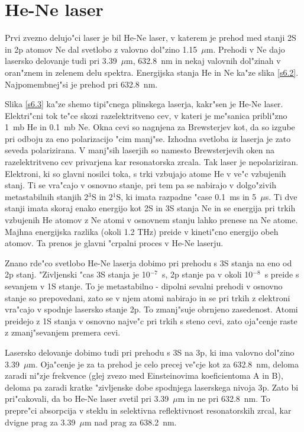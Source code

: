 \section{He-Ne laser}

Prvi zvezno delujo"ci laser je bil He-Ne laser, v katerem je prehod med
stanji 2S in 2p atomov Ne dal svetlobo z valovno dol"zino 1.15~$\mu$m.
Prehodi v Ne dajo lasersko delovanje tudi pri 3.39~$\mu$m, 632.8~nm in nekaj
valovnih dol"zinah v oran"znem in zelenem delu spektra. Energijska stanja He
in Ne ka"ze slika \ref{s6.2}. Najpomembnej"si je prehod pri 632.8~nm.

Slika \ref{s6.3} ka"ze shemo tipi"cnega plinskega laserja, kakr"sen je He-Ne
laser. Elektri"cni tok te"ce skozi razelektritveno cev, v kateri je
me"sanica pribli"zno 1~mb He in 0.1~mb Ne. Okna cevi so nagnjena za
Brewsterjev kot, da so izgube pri odboju za eno polarizacijo "cim manj"se.
Izhodna svetloba iz laserja je zato seveda polarizirana. V manj"sih laserjih
so namesto Brewsterjevih oken na razelektritveno cev privarjena kar
resonatorska zrcala. Tak laser je nepolariziran. Elektroni, ki so glavni
nosilci toka, s trki vzbujajo atome He v ve"c vzbujenih stanj. Ti se
vra"cajo v osnovno stanje, pri tem pa se nabirajo v dolgo"zivih
metastabilnih stanjih 2$^3$S in 2$^1$S, ki imata razpadne "case 0.1~ms in 5~$%
\mu$s. Ti dve stanji imata skoraj enako energijo kot 2S in 3S stanja Ne in
se energija pri trkih vzbujenih He atomov z Ne atomi v osnovnem stanju lahko
prenese na Ne atome. Majhna energijska razlika (okoli 1.2 THz) preide v
kineti"cno energijo obeh atomov. Ta prenos je glavni "crpalni proces v He-Ne
laserju.

Znano rde"co svetlobo He-Ne laserja dobimo pri prehodu s 3S stanja na eno od
2p stanj. "Zivljenski "cas 3S stanja je 10$^{-7}$~s, 2p stanje pa v okoli 10$%
^{-8}$~s preide s sevanjem v 1S stanje. To je metastabilno - dipolni sevalni
prehodi v osnovno stanje so prepovedani, zato se v njem atomi nabirajo in se
pri trkih z elektroni vra"cajo v spodnje lasersko stanje 2p. To zmanj"suje
obrnjeno zasedenost. Atomi preidejo z 1S stanja v osnovno najve"c pri trkih
s steno cevi, zato oja"cenje raste z zmanj"sevanjem premera cevi.

Lasersko delovanje dobimo tudi pri prehodu s 3S na 3p, ki ima valovno
dol"zino 3.39~$\mu$m. Oja"cenje je za ta prehod je celo precej ve"cje kot za
632.8~nm, deloma zaradi ni"zje frekvence (glej zvezo med Einsteinovima
koeficientoma A in B), deloma pa zaradi kratke "zivljenske dobe spodnjega
laserskega nivoja 3p. Zato bi pri"cakovali, da bo He-Ne laser svetil pri
3.39~$\mu$m in ne pri 632.8~nm. To prepre"ci absorpcija v steklu in
selektivna reflektivnost resonatorskih zrcal, kar dvigne prag za 3.39~$\mu$m
nad prag za 638.2~nm.


